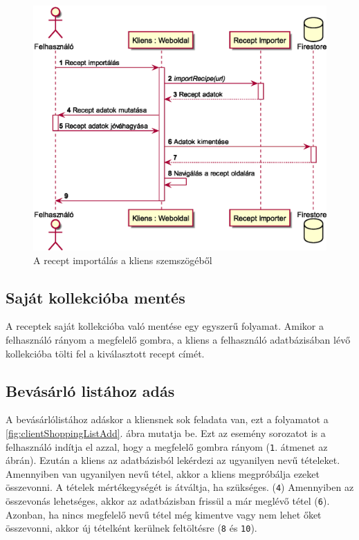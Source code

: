 \documentclass[12pt]{report}
\theoremstyle{definition}
\begin{document}
\noindent
\begin{figure}[H]
	\centering
	\includegraphics[width=.8\textwidth]{out/diagrams/clientRecipeImport/clientRecipeImport.eps}
	\caption{A recept importálás a kliens szemszögéből}
    \label{fig:clientRecipeImport}
\end{figure}

\subsection{Saját kollekcióba mentés}
A receptek saját kollekcióba való mentése egy egyszerű folyamat. 
Amikor a felhasználó rányom a megfelelő gombra, a kliens a felhasználó adatbázisában lévő kollekcióba tölti fel a kiválasztott recept címét.

\subsection{Bevásárló listához adás}
A bevásárlólistához adáskor a kliensnek sok feladata van, ezt a folyamatot a \ref{fig:clientShoppingListAdd}. ábra mutatja be.
Ezt az esemény sorozatot is a felhasználó indítja el azzal, hogy a megfelelő gombra rányom (\verb+1+. átmenet az ábrán). 
Ezután a kliens az adatbázisból lekérdezi az ugyanilyen nevű tételeket. 
Amennyiben van ugyanilyen nevű tétel, akkor a kliens megpróbálja ezeket összevonni.
A tételek mértékegységét is átváltja, ha szükséges. (\verb+4+)
Amennyiben az összevonás lehetséges, akkor az adatbázisban frissül a már meglévő tétel (\verb+6+).
Azonban, ha nincs megfelelő nevű tétel még kimentve vagy nem lehet őket összevonni, akkor új tételként kerülnek feltöltésre (\verb+8+ és \verb+10+).
\end{document}
